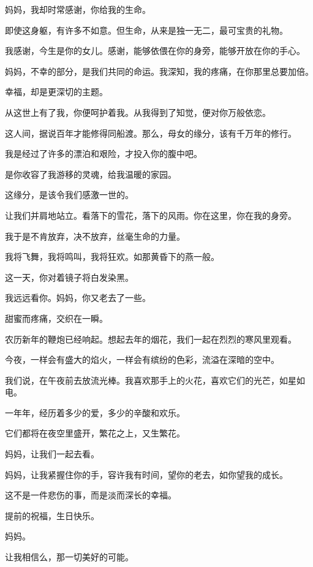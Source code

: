 \documentclass[12pt,a4paper]{article}
\def\blankrev{\vspace{1ex}}									%
\begin{document}
		\blankrev
		妈妈，我却时常感谢，你给我的生命。\par
		即使这身躯，有许多不如意。但生命，从来是独一无二，最可宝贵的礼物。\par
		我感谢，今生是你的女儿。感谢，能够依偎在你的身旁，能够开放在你的手心。\par
		妈妈，不幸的部分，是我们共同的命运。我深知，我的疼痛，在你那里总要加倍。\par
		幸福，却是更深切的主题。\par
		从这世上有了我，你便呵护着我。从我得到了知觉，便对你万般依恋。\par
		这人间，据说百年才能修得同船渡。那么，母女的缘分，该有千万年的修行。\par
		我是经过了许多的漂泊和艰险，才投入你的腹中吧。\par
		是你收容了我游移的灵魂，给我温暖的家园。\par
		这缘分，是该令我们感激一世的。\par
		让我们并肩地站立。看落下的雪花，落下的风雨。你在这里，你在我的身旁。\par
		我于是不肯放弃，决不放弃，丝毫生命的力量。\par
		我将飞舞，我将鸣叫，我将狂欢。如那黄昏下的燕一般。

		\blankrev
		这一天，你对着镜子将白发染黑。\par
		我远远看你。妈妈，你又老去了一些。\par
		甜蜜而疼痛，交织在一瞬。\par
		农历新年的鞭炮已经响起。想起去年的烟花，我们一起在烈烈的寒风里观看。\par
		今夜，一样会有盛大的焰火，一样会有缤纷的色彩，流溢在深暗的空中。\par
		我们说，在午夜前去放流光棒。我喜欢那手上的火花，喜欢它们的光芒，如星如电。\par
		一年年，经历着多少的爱，多少的辛酸和欢乐。\par
		它们都将在夜空里盛开，繁花之上，又生繁花。\par
		妈妈，让我们一起去看。\par
		妈妈，让我紧握住你的手，容许我有时间，望你的老去，如你望我的成长。\par
		这不是一件悲伤的事，而是淡而深长的幸福。

		\blankrev
		提前的祝福，生日快乐。

		妈妈。

	\endwriting



		让我相信么，那一切美好的可能。
\end{document}
